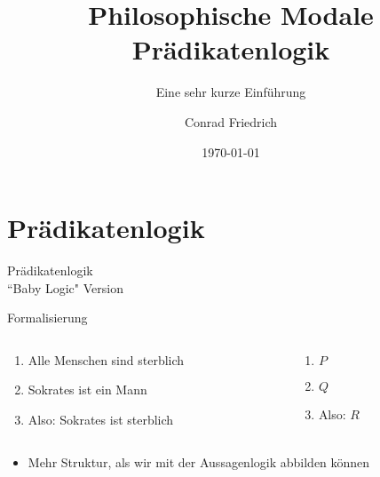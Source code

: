 \documentclass[12pt]{beamer}
\title[Modale Prädikatenlogik]{Philosophische Modale Prädikatenlogik}
\subtitle{Eine sehr kurze Einführung}
\author{Conrad Friedrich}
\institute[Uni Köln]{Universität zu Köln}
\date{\today}
\begin{document}
\begin{frame}
\titlepage
\end{frame}

\section{Prädikatenlogik}

\begin{frame}
  \Huge Prädikatenlogik \\
  \pause \large ``Baby Logic" Version
\end{frame}

\begin{frame}{Formalisierung}
  \begin{columns}

    \begin{column}[t]{5cm}
      \begin{enumerate}
      \item<1-> Alle Menschen sind sterblich \\
      \item<1-> Sokrates ist ein Mann\\
      \item<2-> Also: Sokrates ist sterblich
      \end{enumerate}
    \end{column}

    \begin{column}[t]{5cm}
      \begin{enumerate}
      \item<3-> $P$
      \item<3-> $Q$
      \item<3-> Also: $R$
      \end{enumerate}
    \end{column}

  \end{columns}

  \vspace{10 mm}
  \begin{itemize}
  \item<4-> Mehr Struktur, als wir mit der Aussagenlogik abbilden
    können
  \end{itemize}
\end{frame}
\end{document}
